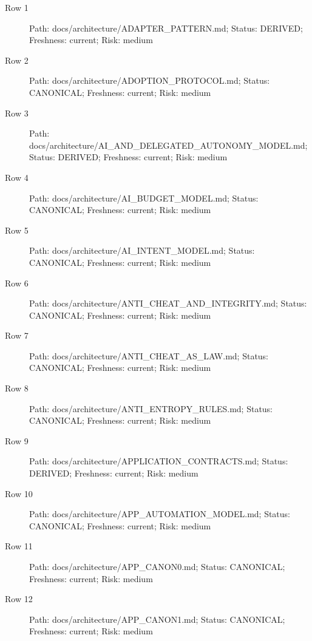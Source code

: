 \documentclass[10.5pt,a4paper,openany]{book}
\begin{document}
\begin{description}
\item[Row 1] Path: docs/\allowbreak{}architecture/\allowbreak{}ADAPTER\_\allowbreak{}PATTERN.\allowbreak{}md; Status: DERIVED; Freshness: current; Risk: medium
\item[Row 2] Path: docs/\allowbreak{}architecture/\allowbreak{}ADOPTION\_\allowbreak{}PROTOCOL.\allowbreak{}md; Status: CANONICAL; Freshness: current; Risk: medium
\item[Row 3] Path: docs/\allowbreak{}architecture/\allowbreak{}AI\_\allowbreak{}AND\_\allowbreak{}DELEGATED\_\allowbreak{}AUTONOMY\_\allowbreak{}MODEL.\allowbreak{}md; Status: DERIVED; Freshness: current; Risk: medium
\item[Row 4] Path: docs/\allowbreak{}architecture/\allowbreak{}AI\_\allowbreak{}BUDGET\_\allowbreak{}MODEL.\allowbreak{}md; Status: CANONICAL; Freshness: current; Risk: medium
\item[Row 5] Path: docs/\allowbreak{}architecture/\allowbreak{}AI\_\allowbreak{}INTENT\_\allowbreak{}MODEL.\allowbreak{}md; Status: CANONICAL; Freshness: current; Risk: medium
\item[Row 6] Path: docs/\allowbreak{}architecture/\allowbreak{}ANTI\_\allowbreak{}CHEAT\_\allowbreak{}AND\_\allowbreak{}INTEGRITY.\allowbreak{}md; Status: CANONICAL; Freshness: current; Risk: medium
\item[Row 7] Path: docs/\allowbreak{}architecture/\allowbreak{}ANTI\_\allowbreak{}CHEAT\_\allowbreak{}AS\_\allowbreak{}LAW.\allowbreak{}md; Status: CANONICAL; Freshness: current; Risk: medium
\item[Row 8] Path: docs/\allowbreak{}architecture/\allowbreak{}ANTI\_\allowbreak{}ENTROPY\_\allowbreak{}RULES.\allowbreak{}md; Status: CANONICAL; Freshness: current; Risk: medium
\item[Row 9] Path: docs/\allowbreak{}architecture/\allowbreak{}APPLICATION\_\allowbreak{}CONTRACTS.\allowbreak{}md; Status: DERIVED; Freshness: current; Risk: medium
\item[Row 10] Path: docs/\allowbreak{}architecture/\allowbreak{}APP\_\allowbreak{}AUTOMATION\_\allowbreak{}MODEL.\allowbreak{}md; Status: CANONICAL; Freshness: current; Risk: medium
\item[Row 11] Path: docs/\allowbreak{}architecture/\allowbreak{}APP\_\allowbreak{}CANON0.\allowbreak{}md; Status: CANONICAL; Freshness: current; Risk: medium
\item[Row 12] Path: docs/\allowbreak{}architecture/\allowbreak{}APP\_\allowbreak{}CANON1.\allowbreak{}md; Status: CANONICAL; Freshness: current; Risk: medium

\end{description}
\end{document}
